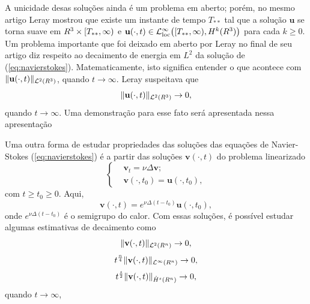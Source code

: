 \documentclass[xcolor=dvipsnames, aspectratio=169, 10pt]{beamer}
\let\mathbb\relax
\newcommand{\bR}{\mathbb{R}}
\newcommand{\bu}{\mathbf{u}}
\newcommand{\bv}{\mathbf{v}}
\newcommand{\cL}{\mathcal{L}}
\newcommand{\loc}{\mathrm{loc}}
\begin{document}
\begin{frame}
    A unicidade desas soluções ainda é um problema em aberto; porém, no mesmo artigo Leray mostrou que existe um instante de tempo $T_{**}$ tal que a solução $\bu$ se torna suave em $\bR^3 \times [T_{**}, \infty)$ e $\bu(\cdot,t) \in \cL^{\infty}_{\loc}\big( [T_{**}, \infty), H^k(\bR^3) \big)$ para cada $k \geqslant 0$.
    Um problema importante que foi deixado em aberto por Leray no final de seu artigo diz respeito ao decaimento de energia em $L^2$ da solução de (\ref{eq:navierstokes}). Matematicamente, isto significa entender o que acontece com $\Vert \bu(\cdot,t) \Vert_{\cL^2(\bR^3)}$, quando $t \to \infty$. Leray suspeitava que
    \[
        \Vert \bu(\cdot,t) \Vert_{\cL^2(\bR^3)} \to 0,
    \]
    quando $t \to \infty$. Uma demonstração para esse fato será apresentada nessa apresentação
\end{frame}
\begin{frame}
    Uma outra forma de estudar propriedades das soluções das equações de Navier-Stokes (\ref{eq:navierstokes}) é a partir das soluções $\bv(\cdot,t)$ do problema linearizado
\begin{equation} \label{eq:navier-stokes-linearizado}
    \left\{
        \begin{aligned}
        &\bv_t = \nu \Delta \bv;\\
        &\bv(\cdot,t_0) = \bu(\cdot,t_0),
    \end{aligned}
    \right.
\end{equation}
com $t \geqslant t_0 \geqslant 0$. Aqui, 
\[
    \bv(\cdot,t) = e^{\nu \Delta (t-t_0)} \bu(\cdot,t_0),
\]
onde $e^{\nu \Delta (t-t_0)}$ é o semigrupo do calor.
Com essas soluções, é possível estudar algumas estimativas de decaimento como
\[
    \Vert \bv(\cdot,t) \Vert_{\cL^2(\bR^n)} \to 0,
\]
\[
    t^{\frac{n}{4}}\Vert \bv(\cdot,t) \Vert_{\cL^\infty(\bR^n)} \to 0,
\]
\begin{equation} \label{eq:estimativa-sobolev-homogeneo}
    t^{\frac{s}{2}} \Vert \bv(\cdot,t) \Vert_{\dot{H}^s(\bR^n)} \to 0,
\end{equation}
quando $t \to \infty$,
\end{frame}
\end{document}
